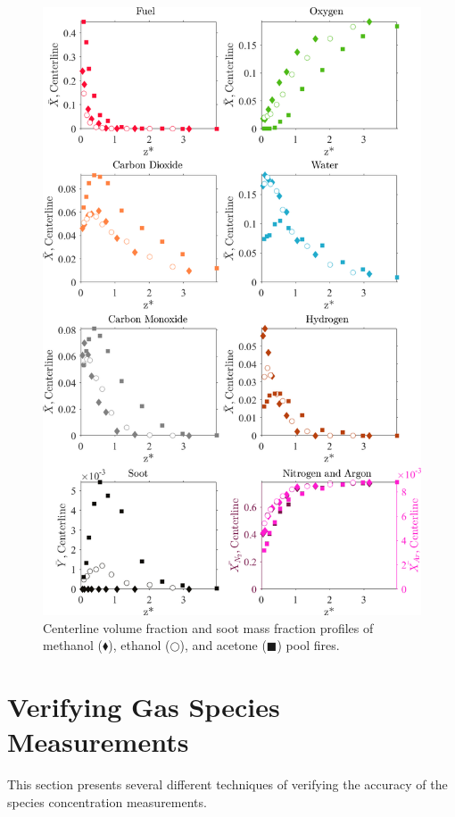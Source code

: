 \documentclass[12pt]{article}
\begin{document}
\begin{figure}[!]
	\centering
\includegraphics[width=12.5cm,keepaspectratio]{OVERALL_Fuel_Comparison.png}
	\caption[Major Species Comparison]{Centerline volume fraction and soot mass fraction profiles of methanol ($\blacklozenge$), ethanol ($\bigcirc$), and acetone ($\blacksquare$) pool fires.}
	\label{fig:Fuel_Comparison}
\end{figure}


\clearpage

\section{Verifying Gas Species Measurements}
\label{ssec:Verifying_Vol_Frac_Measurements}

This section presents several different techniques of verifying the accuracy of the species concentration measurements.
\end{document}
